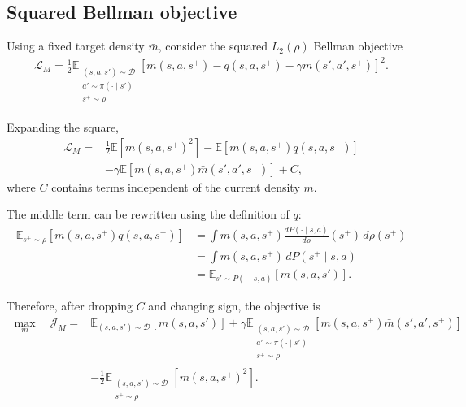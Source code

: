 \documentclass[11pt]{article}
\begin{document}
\subsection{Squared Bellman objective}

Using a fixed target density $\bar m$, consider the squared $L_2(\rho)$ Bellman objective
\begin{align}
\mathcal L_M    =   \frac12 \mathbb E_{\substack{(s,a,s')\sim\mathcal D\\ a'\sim\pi(\cdot\mid s')\\ s^+\sim\rho }}  \left[  m(s,a,s^+)  -   q(s,a,s^+)  -   \gamma\bar m(s',a',s^+) \right]^2.
\label{eq:M-L2}
\end{align}

Expanding the square,
\begin{equation}
\begin{aligned}
\mathcal L_M    ={}&    \frac12 \mathbb E \left[ m(s,a,s^+)^2 \right]
                    -  \mathbb E \left[  m(s,a,s^+)  q(s,a,s^+)  \right] \\
                    &-  \gamma  \mathbb E \left[m(s,a,s^+) \bar m(s',a',s^+) \right]  + C,
\end{aligned}
\label{eq:M-expanded}
\end{equation}
where $C$ contains terms independent of the current density $m$.

The middle term can be rewritten using the definition of $q$:
\begin{align}
    \mathbb E_{s^+\sim\rho} \left[ m(s,a,s^+)q(s,a,s^+) \right] &= \int m(s,a,s^+) \frac{dP(\cdot\mid s,a)}{d\rho}(s^+) \,d\rho(s^+) \\
    &= \int m(s,a,s^+) \,dP(s^+\mid s,a) \\
    &= \mathbb E_{s'\sim P(\cdot\mid s,a)} \left[ m(s,a,s') \right].
    \label{eq:change-measure-M}
\end{align}

Therefore, after dropping $C$ and changing sign, the objective is
\begin{equation}
\boxed{
\begin{aligned} 
    \max_m\quad \mathcal J_M ={}& \mathbb E_{(s,a,s')\sim\mathcal D} \left[ m(s,a,s') \right]
                                + \gamma \mathbb E_{\substack{ (s,a,s')\sim\mathcal D\\ a'\sim\pi(\cdot\mid s')\\ s^+\sim\rho }} \left[ m(s,a,s^+) \bar m(s',a',s^+) \right] \\
                                &- \frac12 \mathbb E_{\substack{ (s,a,s')\sim\mathcal D\\ s^+\sim\rho }} \left[ m(s,a,s^+)^2 \right].
\end{aligned}
}
\label{eq:M-objective}
\end{equation}
\end{document}
